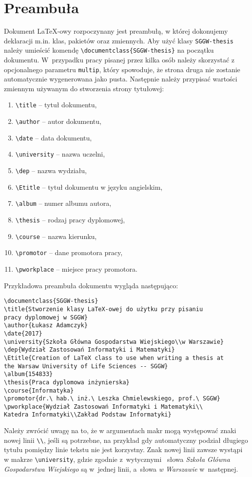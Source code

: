 \documentclass{SGGW-thesis}
\begin{document}
\section{Preambuła}
Dokument \LaTeX-owy rozpoczynany jest preambułą, w której dokonujemy deklaracji m.in. klas, pakietów oraz zmiennych. Aby użyć klasy {\tt SGGW-thesis} należy umieścić komendę
\verb|\documentclass{SGGW-thesis}| na początku dokumentu. W~przypadku pracy pisanej przez kilka osób należy skorzystać z opcjonalnego parametru \verb|multip|, który
spowoduje, że strona druga nie zostanie automatycznie wygenerowana jako pusta.  Następnie należy przypisać wartości zmiennym używanym do stworzenia strony tytułowej:
\begin{enumerate}[label=\alph*.]
\item{\verb|\title| -- tytuł dokumentu,}
\item{\verb|\author| -- autor dokumentu,}
\item{\verb|\date|  -- data dokumentu,}
\item{\verb|\university| -- nazwa uczelni,}
\item{\verb|\dep| -- nazwa wydziału,}
\item{\verb|\Etitle| -- tytuł dokumentu w języku angielskim,}
\item{\verb|\album| -- numer albumu autora,}
\item{\verb|\thesis| -- rodzaj pracy dyplomowej,}
\item{\verb|\course| -- nazwa kierunku,}
\item{\verb|\promotor| -- dane promotora pracy,}
\item{\verb|\pworkplace| -- miejsce pracy promotora.}
\end{enumerate}
Przykładowa preambuła dokumentu wygląda następująco:
\begin{verbatim}
\documentclass{SGGW-thesis}
\title{Stworzenie klasy LaTeX-owej do użytku przy pisaniu
pracy dyplomowej w SGGW}
\author{Łukasz Adamczyk}
\date{2017}
\university{Szkoła Główna Gospodarstwa Wiejskiego\\w Warszawie}
\dep{Wydział Zastosowań Informatyki i Matematyki}
\Etitle{Creation of LaTeX class to use when writing a thesis at
the Warsaw University of Life Sciences -- SGGW}
\album{154833}
\thesis{Praca dyplomowa inżynierska}
\course{Informatyka}
\promotor{dr.\ hab.\ inż.\ Leszka Chmielewskiego, prof.\ SGGW}
\pworkplace{Wydział Zastosowań Informatyki i Matematyki\\
Katedra Informatyki\\Zakład Podstaw Informatyki}
\end{verbatim}
Należy zwrócić uwagę na to, że w argumentach makr mogą występować znaki nowej linii \verb|\\|, jeśli są potrzebne, na przykład gdy automatyczny podział długiego tytułu
pomiędzy linie tekstu nie jest korzystny. Znak nowej linii zawsze wystąpi w makrze \verb|\university|, gdzie zgodnie z~wytycznymi~\cite{wymagania} słowa {\em Szkoła Główna
Gospodarstwa Wiejskiego} są w~jednej linii, a~słowa {\em w Warszawie} w~następnej.
\end{document}
